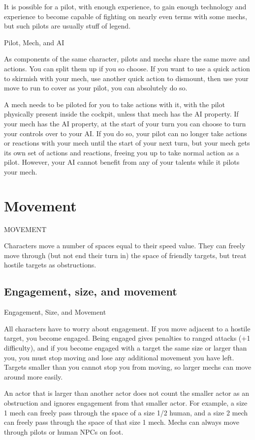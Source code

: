 It is possible for a pilot, with enough experience, to gain enough technology and experience to  
become capable of fighting on nearly even terms with some mechs, but such pilots are usually  
stuff of legend.  

                                                Pilot, Mech, and AI  

As components of the same character, pilots and mechs share the same move and actions. You  
can split them up if you so choose. If you want to use a quick action to skirmish with your mech,  
use another quick action to dismount, then use your move to run to cover as your pilot, you can  
absolutely do so.  

A mech needs to be piloted for you to take actions with it, with the pilot physically present inside  
the cockpit, unless that mech has the AI property. If your mech has the AI property, at the start of  
your turn you can choose to turn your controls over to your AI. If you do so, your pilot can no  
longer take actions or reactions with your mech until the start of your next turn, but your mech  
gets its own set of actions and reactions, freeing you up to take normal action as a pilot. However,  
your AI cannot benefit from any of your talents while it pilots your mech.  

\chapter{Movement}
MOVEMENT  

Characters move a number of spaces equal to their speed value. They can freely move through  
(but not end their turn in) the space of friendly targets, but treat hostile targets as obstructions. 
 
\section{Engagement, size, and movement}
                             Engagement, Size, and Movement   

All characters have to worry about engagement. If you move adjacent to a hostile target, you  
become engaged. Being engaged gives penalties to ranged attacks (+1 difficulty), and if you  
become engaged with a target the same size or larger than you, you must stop moving and lose  
any additional movement you have left. Targets smaller than you cannot stop you from moving,  
so larger mechs can move around more easily.
 

An actor that is larger than another actor does not count the smaller actor as an obstruction and  
ignores engagement from that smaller actor. For example, a size 1 mech can freely pass through  
the space of a size 1/2 human, and a size 2 mech can freely pass through the space of that size 1  
mech. Mechs can always move through pilots or human NPCs on foot.
 

